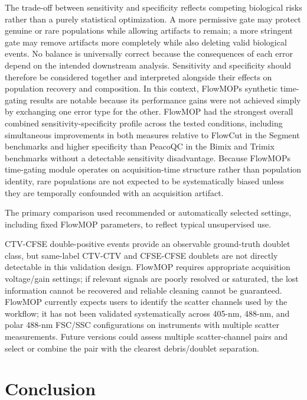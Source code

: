 \documentclass[ASNA]{latex/wiley/USG}
\begin{document}
The trade-off between sensitivity and specificity reflects competing
biological risks rather than a purely statistical optimization. A more
permissive gate may protect genuine or rare populations while allowing
artifacts to remain; a more stringent gate may remove artifacts more
completely while also deleting valid biological events. No balance is
universally correct because the consequences of each error depend on the
intended downstream analysis. Sensitivity and specificity should
therefore be considered together and interpreted alongside their effects
on population recovery and composition. In this context,
FlowMOP\textquotesingle s synthetic time-gating results are notable
because its performance gains were not achieved simply by exchanging one
error type for the other. FlowMOP had the strongest overall combined
sensitivity-specificity profile across the tested conditions, including
simultaneous improvements in both measures relative to FlowCut in the
Segment benchmarks and higher specificity than PeacoQC in the Bimix and
Trimix benchmarks without a detectable sensitivity disadvantage. Because
FlowMOP\textquotesingle s time-gating module operates on
acquisition-time structure rather than population identity, rare
populations are not expected to be systematically biased unless they are
temporally confounded with an acquisition artifact.

The primary comparison used recommended or automatically selected
settings, including fixed FlowMOP parameters, to reflect typical
unsupervised use.

CTV-CFSE double-positive events provide an observable ground-truth
doublet class, but same-label CTV-CTV and CFSE-CFSE doublets are not
directly detectable in this validation design. FlowMOP requires
appropriate acquisition voltage/gain settings; if relevant signals are
poorly resolved or saturated, the lost information cannot be recovered
and reliable cleaning cannot be guaranteed. FlowMOP currently expects
users to identify the scatter channels used by the workflow; it has not
been validated systematically across 405-nm, 488-nm, and polar 488-nm
FSC/SSC configurations on instruments with multiple scatter
measurements. Future versions could assess multiple scatter-channel
pairs and select or combine the pair with the clearest debris/doublet
separation.

\FloatBarrier

\section{Conclusion}\label{conclusion}
\end{document}
